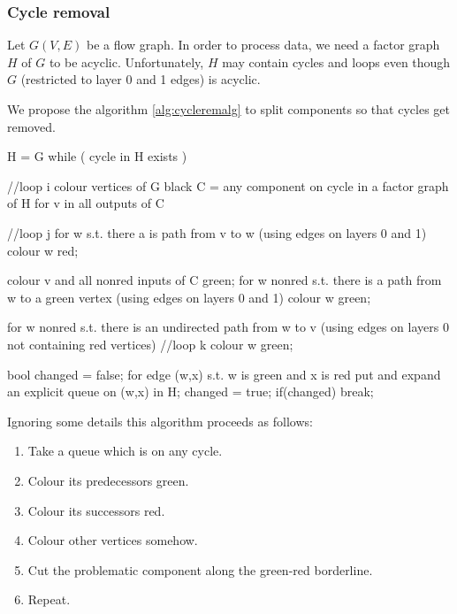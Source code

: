\subsubsection{Cycle removal}

Let $G(V,E)$ be a flow graph. In order to process data, we need a factor graph $H$ of $G$ to be acyclic. Unfortunately, $H$ may contain cycles and loops even though $G$ (restricted to layer 0 and 1 edges) is acyclic. 


We propose the algorithm \ref{alg:cycleremalg} to split components so that cycles get removed. 
\ \
\begin{samepage}
\begin{code}
  H = G
while ( cycle in H exists )     
{ //loop i
  colour vertices of G black
  C = any component on cycle in a factor graph of H
  for v in all outputs of C     
  { //loop j
    for w s.t. there a is path from v to w 
    (using edges on layers 0 and 1)
    {
      colour w red;
    }

    colour v and all nonred inputs of C green;
    for w nonred s.t. there is a path from w to a green vertex
    (using edges on layers 0 and 1)
    {
      colour w green;
    }

    for w nonred s.t. there is an undirected path from w to v
    (using edges on layers 0 not containing red vertices)
    { //loop k
      colour w green;
    }

    bool changed = false;
    for edge (w,x) s.t. w is green and x is red
    {
      put and expand an explicit queue on (w,x) in H;
      changed = true;
    }
    if(changed)
      break;
  }
}
\end{code}
\end{samepage}
\myendalg

Ignoring some details this algorithm proceeds as follows:

\begin{enumerate}
  \item Take a queue which is on any cycle.
  \item Colour its predecessors green.
  \item Colour its successors red.
  \item Colour other vertices somehow.
  \item Cut the problematic component along the green-red borderline.
  \item Repeat.
\end{enumerate}

